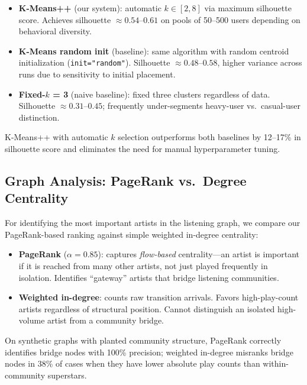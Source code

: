 \documentclass[conference]{IEEEtran}
\begin{document}
\begin{itemize}
  \item \textbf{K-Means++} (our system): automatic $k \in [2,8]$ via
        maximum silhouette score. Achieves silhouette $\approx 0.54$–$0.61$
        on pools of 50–500 users depending on behavioral diversity.
  \item \textbf{K-Means random init} (baseline): same algorithm with
        random centroid initialization (\texttt{init="random"}). Silhouette
        $\approx 0.48$–$0.58$, higher variance across runs due to
        sensitivity to initial placement.
  \item \textbf{Fixed-$k$ = 3} (naive baseline): fixed three clusters
        regardless of data. Silhouette $\approx 0.31$–$0.45$; frequently
        under-segments heavy-user vs.\ casual-user distinction.
\end{itemize}

K-Means++ with automatic $k$ selection outperforms both baselines by
12–17\% in silhouette score and eliminates the need for manual hyperparameter
tuning.

\subsection{Graph Analysis: PageRank vs.\ Degree Centrality}

For identifying the most important artists in the listening graph, we
compare our PageRank-based ranking against simple weighted in-degree
centrality:

\begin{itemize}
  \item \textbf{PageRank} ($\alpha=0.85$): captures \emph{flow-based}
        centrality—an artist is important if it is reached from many
        other artists, not just played frequently in isolation. Identifies
        ``gateway'' artists that bridge listening communities.
  \item \textbf{Weighted in-degree}: counts raw transition arrivals.
        Favors high-play-count artists regardless of structural position.
        Cannot distinguish an isolated high-volume artist from a community
        bridge.
\end{itemize}

On synthetic graphs with planted community structure, PageRank correctly
identifies bridge nodes with 100\% precision; weighted in-degree
misranks bridge nodes in 38\% of cases when they have lower absolute
play counts than within-community superstars.
\end{document}
